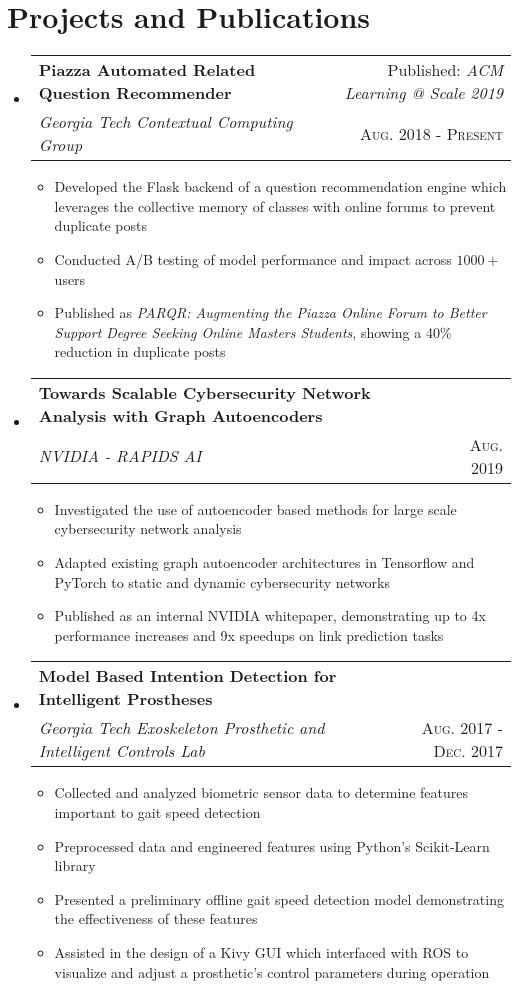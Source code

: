 \documentclass[letterpaper,11pt]{article}
\makeatletter
\newcommand{\resumePlainItem}[1]{
  \item\small{#1 \vspace{-2pt}}
}
\newcommand{\resumeSubheading}[4]{
  \vspace{-1pt}\item[]
    \begin{tabular*}{0.97\textwidth}{l@{\extracolsep{\fill}}r}
      \textbf{#1} & #2 \\
      \textit{\small#3} & \textsc{\small #4} \\ %
    \end{tabular*}\vspace{-5pt}
}
\newcommand{\resumeSubHeadingListStart}{\begin{itemize}[leftmargin=*]}
\newcommand{\resumeSubHeadingListEnd}{\end{itemize}}
\newcommand{\resumeItemListStart}{\begin{itemize}}
\newcommand{\resumeItemListEnd}{\end{itemize}\vspace{-5pt}}
\newenvironment{resumeItemList}{\resumeItemListStart}{\resumeItemListEnd}
\newenvironment{resumeSubheadingList}{\resumeSubHeadingListStart}{\resumeSubHeadingListEnd}
\makeatother
\begin{document}
\section{Projects and Publications}
  \begin{resumeSubheadingList}
    \resumeSubheading
    {Piazza Automated Related Question Recommender}{Published: \textit{ACM Learning @ Scale 2019}}
    {Georgia Tech Contextual Computing Group}{Aug. 2018 - Present}
    \begin{resumeItemList}
      \resumePlainItem{Developed the Flask backend of a question recommendation engine which leverages the collective
      memory of classes with online forums to prevent duplicate posts}
      \resumePlainItem{Conducted A/B testing of model performance and impact across $1000+$ users}
      \resumePlainItem{Published as \textit{PARQR: Augmenting the Piazza Online Forum to Better Support Degree Seeking Online Masters Students},
      showing a 40\% reduction in duplicate posts} %
    \end{resumeItemList}

    \resumeSubheading
    {Towards Scalable Cybersecurity Network Analysis with Graph Autoencoders}{}
    {NVIDIA - RAPIDS AI}{Aug. 2019}
    \begin{resumeItemList}
      \resumePlainItem{Investigated the use of autoencoder based methods for large scale cybersecurity network analysis}
      \resumePlainItem{Adapted existing graph autoencoder architectures in Tensorflow and PyTorch to static and dynamic
      cybersecurity networks}
      \resumePlainItem{Published as an internal NVIDIA whitepaper, demonstrating up to 4x performance increases and 
      9x speedups on link prediction tasks}
    \end{resumeItemList}

    \resumeSubheading
    {Model Based Intention Detection for Intelligent Prostheses}{}
    {Georgia Tech Exoskeleton Prosthetic and Intelligent Controls Lab}{Aug. 2017 - Dec. 2017}
    \begin{resumeItemList}
      \resumePlainItem{Collected and analyzed biometric sensor data to determine features important to gait
      speed detection}
      \resumePlainItem{Preprocessed data and engineered features using Python's Scikit-Learn library} %
      \resumePlainItem{Presented a preliminary offline gait speed detection model demonstrating the effectiveness of these features}
      \resumePlainItem{Assisted in the design of a Kivy GUI which interfaced with ROS to visualize and adjust a prosthetic's control
      parameters during operation}
    \end{resumeItemList}
  \end{resumeSubheadingList}
\end{document}
